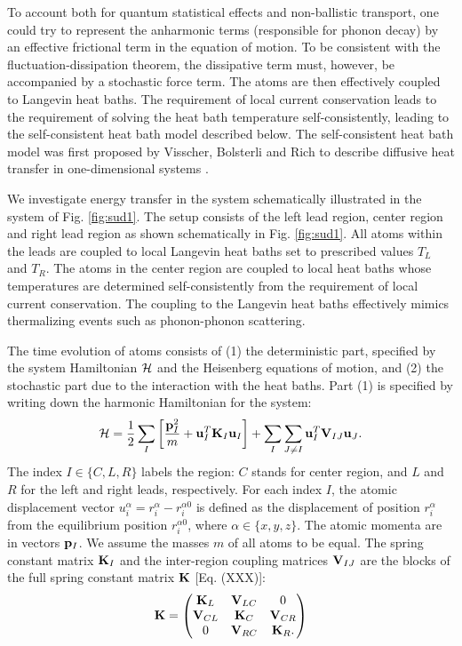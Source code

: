 To account both for quantum statistical effects and non-ballistic transport, one could try to represent the anharmonic terms (responsible for phonon decay) by an effective frictional term in the equation of motion. To be consistent with the fluctuation-dissipation theorem, the dissipative term must, however, be accompanied by a stochastic force term. The atoms are then effectively coupled to Langevin heat baths. The requirement of local current conservation leads to the requirement of solving the heat bath temperature self-consistently, leading to the self-consistent heat bath model described below. The self-consistent heat bath model was first proposed by Visscher, Bolsterli and Rich to describe diffusive heat transfer in one-dimensional systems \cite{}.

We investigate energy transfer in the system schematically illustrated in the system of Fig. \ref{fig:sud1}. The setup consists of the left lead region, center region and right lead region as shown schematically in Fig. \ref{fig:sud1}. All atoms within the leads are coupled to local Langevin heat baths set to prescribed values $T_L$ and $T_R$. The atoms in the center region are coupled to local heat baths whose temperatures are determined self-consistently from the requirement of local current conservation. The coupling to the Langevin heat baths effectively mimics thermalizing events such as phonon-phonon scattering.

The time evolution of atoms consists of (1) the deterministic part, specified by the system Hamiltonian $\mathcal{H}$ and the Heisenberg equations of motion, and (2) the stochastic part due to the interaction with the heat baths.  Part (1) is specified by writing down the harmonic Hamiltonian for the system:
\begin{equation}
 \mathcal{H} = \frac{1}{2}  \sum_I \left[ \frac{\mathbf{p}_I^2}{m}+\mathbf{u}_I^T\mathbf{K}_I \mathbf{u}_I \right] + \sum_I \sum_{J\neq I} \mathbf{u}_I^T \mathbf{V}_{IJ} \mathbf{u}_J.
\end{equation}
The index $I\in\{C,L,R\}$ labels the region: $C$ stands for center region, and $L$ and $R$ for the left and right leads, respectively. For each index $I$, the atomic displacement vector $u_i^{\alpha}=r_i^{\alpha}-r_i^{\alpha 0}$ is defined as the displacement of position $r_i^{\alpha}$ from the equilibrium position $r^{\alpha 0}_i$, where $\alpha\in\{x,y,z\}$. The atomic momenta are in vectors $\mathbf{p}_I$. We assume the masses $m$ of all atoms to be equal. The spring constant matrix $\mathbf{K}_I$ and the inter-region coupling matrices $\mathbf{V}_{IJ}$ are the blocks of the full spring constant matrix $\mathbf{K}$ [Eq. (XXX)]:
\begin{equation}
 \mathbf{K} = \left(\begin{matrix}
                 \mathbf{K}_L & \mathbf{V}_{LC} & 0 \\
		\mathbf{V}_{CL} & \mathbf{K}_C & \mathbf{V}_{CR} \\
		0 & \mathbf{V}_{RC} & \mathbf{K}_R.
                \end{matrix}
 \right)
\end{equation}
 
